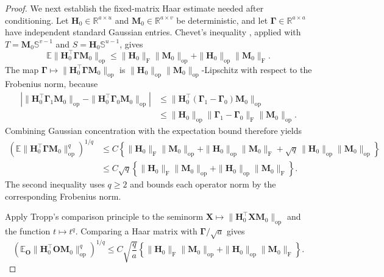 \documentclass[11pt]{article}
\newcommand{\trans}{\top}
\begin{document}
\begin{proof}
We next establish the fixed-matrix Haar estimate needed after conditioning.
Let \(\bm H_0\in\mathbb R^{a\times u}\) and
\(\bm M_0\in\mathbb R^{a\times v}\) be deterministic, and let
\(\bm\Gamma\in\mathbb R^{a\times a}\) have independent standard Gaussian
entries. Chevet's inequality
\cite[Section~8.7]{vershynin2018high}, applied with
\(T=\bm M_0\mathbb S^{v-1}\) and
\(S=\bm H_0\mathbb S^{u-1}\), gives
\[
  \mathbb E
  \|\bm H_0^\trans\bm\Gamma\bm M_0\|_{\mathrm{op}}
  \le
  \|\bm H_0\|_{\mathrm F}\|\bm M_0\|_{\mathrm{op}}
  +
  \|\bm H_0\|_{\mathrm{op}}\|\bm M_0\|_{\mathrm F}.
\]
The map
\(\bm\Gamma\mapsto
\|\bm H_0^\trans\bm\Gamma\bm M_0\|_{\mathrm{op}}\)
is
\(\|\bm H_0\|_{\mathrm{op}}\|\bm M_0\|_{\mathrm{op}}\)-Lipschitz with
respect to the Frobenius norm, because
\[
\begin{aligned}
  \left|
    \|\bm H_0^\trans\bm\Gamma_1\bm M_0\|_{\mathrm{op}}
    -
    \|\bm H_0^\trans\bm\Gamma_0\bm M_0\|_{\mathrm{op}}
  \right|
  &\le
  \|\bm H_0^\trans(\bm\Gamma_1-\bm\Gamma_0)\bm M_0\|_{\mathrm{op}} \\
  &\le
  \|\bm H_0\|_{\mathrm{op}}
  \|\bm\Gamma_1-\bm\Gamma_0\|_{\mathrm F}
  \|\bm M_0\|_{\mathrm{op}}.
\end{aligned}
\]
Combining Gaussian concentration with the expectation bound therefore yields
\[
\begin{aligned}
  \left(
    \mathbb E
    \|\bm H_0^\trans\bm\Gamma\bm M_0\|_{\mathrm{op}}^q
  \right)^{1/q}
  &\le
  C\left\{
    \|\bm H_0\|_{\mathrm F}\|\bm M_0\|_{\mathrm{op}}
    +
    \|\bm H_0\|_{\mathrm{op}}\|\bm M_0\|_{\mathrm F}
    +
    \sqrt q\,
    \|\bm H_0\|_{\mathrm{op}}\|\bm M_0\|_{\mathrm{op}}
  \right\} \\
  &\le
  C\sqrt q
  \left\{
    \|\bm H_0\|_{\mathrm F}\|\bm M_0\|_{\mathrm{op}}
    +
    \|\bm H_0\|_{\mathrm{op}}\|\bm M_0\|_{\mathrm F}
  \right\}.
\end{aligned}
\]
The second inequality uses \(q\ge2\) and bounds each operator norm by the
corresponding Frobenius norm.

Apply Tropp's comparison principle
\cite[Theorem~1]{tropp2012comparison} to the seminorm
\(\bm X\mapsto\|\bm H_0^\trans\bm X\bm M_0\|_{\mathrm{op}}\) and the
function \(t\mapsto t^q\). Comparing a Haar matrix with
\(\bm\Gamma/\sqrt a\) gives
\begin{equation}
\label{eq:fixed-haar-moment}
  \left(
    \mathbb E_{\bm O}
    \|\bm H_0^\trans\bm O\bm M_0\|_{\mathrm{op}}^q
  \right)^{1/q}
  \le
  C\sqrt{\frac qa}
  \left\{
    \|\bm H_0\|_{\mathrm F}\|\bm M_0\|_{\mathrm{op}}
    +
    \|\bm H_0\|_{\mathrm{op}}\|\bm M_0\|_{\mathrm F}
  \right\}.
\end{equation}


\end{proof}
\end{document}

